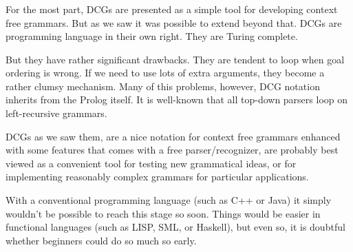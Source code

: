 \begin{frame}[shrink=7]
	\frametitle{\insertsection}
	
	For the most part, DCGs are presented as a simple tool for developing context free grammars. But as we saw it was possible to extend beyond that. DCGs are programming language in their own right. They are Turing complete.
	
	But they have rather significant drawbacks. They are tendent to loop when goal ordering is wrong. If we need to use lots of extra arguments, they become a rather clumsy mechanism. Many of this problems, however, DCG notation inherits from the Prolog itself. It is well-known that all top-down parsers loop on left-recursive grammars.
	
	DCGs as we saw them, are a nice notation for context free grammars enhanced with some features that comes with a free parser/recognizer, are probably best viewed as a convenient tool for testing new grammatical ideas, or for implementing reasonably complex grammars for particular applications.
	
	With a conventional programming language (such as C++ or Java) it simply wouldn’t be possible to reach this stage so soon. Things would be easier in functional languages (such as LISP, SML, or Haskell), but even so, it is doubtful whether beginners could do so much so early.
\end{frame}


